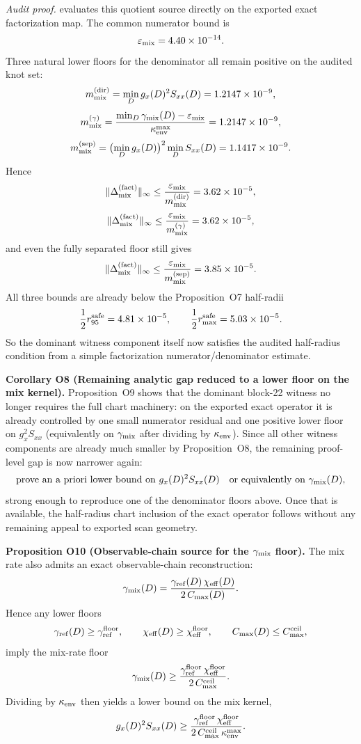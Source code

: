 \documentclass[aps,prd,onecolumn,notitlepage,nofootinbib,superscriptaddress,11pt,floatfix]{revtex4-2}
\begin{document}
\textit{Audit proof.}  evaluates this quotient source directly on the exported exact factorization map. The common numerator bound is
\[
\varepsilon_{\rm mix}=4.40\times10^{-14}.
\]
Three natural lower floors for the denominator all remain positive on the audited knot set:
\[
m_{\rm mix}^{\rm(dir)}=\min_D g_x(D)^2S_{xx}(D)=1.2147\times10^{-9},
\]
\[
m_{\rm mix}^{(\gamma)}=\frac{\min_D\gamma_{\rm mix}(D)-\varepsilon_{\rm mix}}{\kappa_{\rm env}^{\max}}=1.2147\times10^{-9},
\]
\[
m_{\rm mix}^{\rm(sep)}=\bigl(\min_D g_x(D)\bigr)^2\min_D S_{xx}(D)=1.1417\times10^{-9}.
\]
Hence
\[
\|\Delta_{\rm mix}^{\rm(fact)}\|_\infty
\le
\frac{\varepsilon_{\rm mix}}{m_{\rm mix}^{\rm(dir)}}
=3.62\times10^{-5},
\]
\[
\|\Delta_{\rm mix}^{\rm(fact)}\|_\infty
\le
\frac{\varepsilon_{\rm mix}}{m_{\rm mix}^{(\gamma)}}
=3.62\times10^{-5},
\]
and even the fully separated floor still gives
\[
\|\Delta_{\rm mix}^{\rm(fact)}\|_\infty
\le
\frac{\varepsilon_{\rm mix}}{m_{\rm mix}^{\rm(sep)}}
=3.85\times10^{-5}.
\]
All three bounds are already below the Proposition~O7 half-radii
\[
\frac12 r_{95}^{\rm safe}=4.81\times10^{-5},
\qquad
\frac12 r_{\max}^{\rm safe}=5.03\times10^{-5}.
\]
So the dominant witness component itself now satisfies the audited half-radius condition from a simple factorization numerator/denominator estimate.

\medskip\noindent\textbf{Corollary O8 (Remaining analytic gap reduced to a lower floor on the mix kernel).}
Proposition~O9 shows that the dominant block-22 witness no longer requires the full chart machinery: on the exported exact operator it is already controlled by one small numerator residual and one positive lower floor on $g_x^2S_{xx}$ (equivalently on $\gamma_{\rm mix}$ after dividing by $\kappa_{\rm env}$). Since all other witness components are already much smaller by Proposition~O8, the remaining proof-level gap is now narrower again:
\[
\text{prove an a priori lower bound on }g_x(D)^2S_{xx}(D)
\quad\text{or equivalently on }\gamma_{\rm mix}(D),
\]
strong enough to reproduce one of the denominator floors above. Once that is available, the half-radius chart inclusion of the exact operator follows without any remaining appeal to exported scan geometry.

\medskip\noindent\textbf{Proposition O10 (Observable-chain source for the \texorpdfstring{$\gamma_{\rm mix}$}{gamma_mix} floor).}
The mix rate also admits an exact observable-chain reconstruction:
\[
\gamma_{\rm mix}(D)
=
\frac{\gamma_{\rm ref}(D)\,\chi_{\rm eff}(D)}{2\,C_{\max}(D)}.
\]
Hence any lower floors
\[
\gamma_{\rm ref}(D)\ge \gamma_{\rm ref}^{\rm floor},
\qquad
\chi_{\rm eff}(D)\ge \chi_{\rm eff}^{\rm floor},
\qquad
C_{\max}(D)\le C_{\max}^{\rm ceil},
\]
imply the mix-rate floor
\[
\gamma_{\rm mix}(D)\ge
\frac{\gamma_{\rm ref}^{\rm floor}\,\chi_{\rm eff}^{\rm floor}}
{2\,C_{\max}^{\rm ceil}}.
\]
Dividing by $\kappa_{\rm env}$ then yields a lower bound on the mix kernel,
\[
g_x(D)^2 S_{xx}(D)\ge
\frac{\gamma_{\rm ref}^{\rm floor}\,\chi_{\rm eff}^{\rm floor}}
{2\,C_{\max}^{\rm ceil}\,\kappa_{\rm env}^{\max}}.
\]
\end{document}
